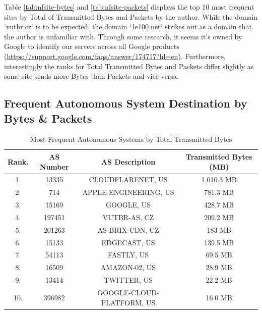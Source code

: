 \documentclass{article}
\begin{document}
Table \ref{tab:nfsite-bytes} and \ref{tab:nfsite-packets} displays the top 10 most frequent sites by Total of Transmitted Bytes and Packets by the author. While the domain `vutbr.cz` is to be expected, the domain `1e100.net` strikes out as a domain that the author is unfamiliar with. Through some research, it seems it's owned by Google to identify our servers across all Google products (\url{https://support.google.com/faqs/answer/174717?hl=en}). Furthermore, interestingly the ranks for Total Transmitted Bytes and Packets differ slightly as some site sends more Bytes than Packets and vice versa.

\subsection{Frequent Autonomous System Destination by Bytes \& Packets}

\begin{table}[H]
    \centering
    \begin{tabular}{cccc}
         Rank. & AS Number & AS Description & Transmitted Bytes (MB)\\
         \hline
         1. & 13335 & CLOUDFLARENET, US & 1,010.3 MB \\
         2. & 714 & APPLE-ENGINEERING, US & 781.3 MB \\
         3. & 15169 & GOOGLE, US & 428.7 MB \\
         4. & 197451 & VUTBR-AS, CZ & 209.2 MB \\
         5. & 201263 & AS-BRIX-CDN, CZ & 183 MB \\
         6. & 15133 & EDGECAST, US & 139.5 MB \\
         7. & 54113 & FASTLY, US & 69.5 MB \\
         8. & 16509 & AMAZON-02, US & 28.9 MB \\
         9. & 13414 & TWITTER, US & 22.2 MB \\
         10. & 396982 & GOOGLE-CLOUD-PLATFORM, US & 16.0 MB \\
    \end{tabular}
    \caption{Most Frequent Autonomous Systems by Total Transmitted Bytes}
    \label{tab:nfas-bytes}
\end{table}
\end{document}
